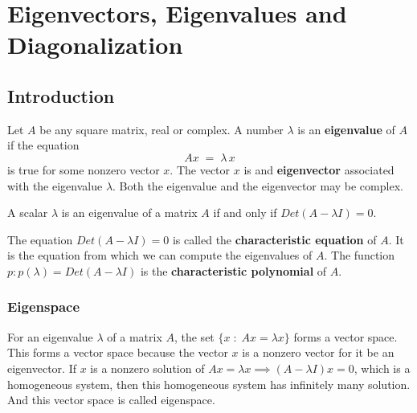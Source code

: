\documentclass[aima104_lecturenotes_ku.tex]{subfiles}
\begin{document}
\chapter{Eigenvectors, Eigenvalues and Diagonalization}
\section{Introduction}
Let $A$ be any square matrix, real or complex. A number $\lambda$ is an \textbf{eigenvalue} of $A$ if the equation $$Ax\; = \; \lambda\,x$$
is true for some nonzero vector $x$. The vector $x$ is and \textbf{eigenvector} associated with the eigenvalue $\lambda$. Both the eigenvalue and the eigenvector may be complex.

\begin{theorem}
  A scalar $\lambda$ is an eigenvalue of a matrix $A$ if and only if $Det(A-\lambda I)=0$.
\end{theorem}
The equation $Det(A-\lambda I)=0$ is called the \textbf{characteristic equation} of $A$. It is the equation from which we can compute the eigenvalues of $A$. The function \\ $p: p(\lambda) = Det(A-\lambda I)$ is the \textbf{characteristic polynomial} of $A$.

\subsection{Eigenspace}
For an eigenvalue $\lambda$ of a matrix $A$, the set $\{x\; : \; Ax=\lambda x\}$ forms a vector space. This forms a vector space because the vector \(x\) is a nonzero vector for it be an eigenvector. If \(x\) is a nonzero solution of \(Ax=\lambda x \implies (A-\lambda I)x=0\), which is a homogeneous system, then this homogeneous system has infinitely many solution. And this vector space is called  eigenspace.
\end{document}
